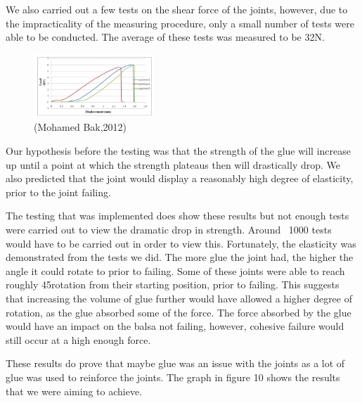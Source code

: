 \documentclass[12pt]{article}
\begin{document}
              
We also carried out a few tests on the shear force of the joints, however, due to the impracticality of the measuring procedure, only a small number of tests were able to be conducted. The average of these tests was measured to be 32N.
                 
                 \begin{figure}[h!]
                          \centering
                          \includegraphics[width=0.4\textwidth]{Articlegraph}
                          \caption{(Mohamed Bak,2012)}
                          \label{GraphGlue}
                 \end{figure}
Our hypothesis before the testing was that the strength of the glue will increase up until a point at which the strength plateaus then will drastically drop. We also predicted that the joint would display a reasonably high degree of elasticity, prior to the joint failing. 

The testing that was implemented does show these results but not enough tests were carried out to view the dramatic drop in strength. Around ~1000 tests would have to be carried out in order to view this. 
Fortunately, the elasticity was demonstrated from the tests we did. The more glue the joint had, the higher the angle it could rotate to prior to failing. Some of these joints were able to reach roughly 45\textdegree rotation from their starting position, prior to failing. This suggests that increasing the volume of glue further would have allowed a higher degree of rotation, as the glue absorbed some of the force. The force absorbed by the glue would have an impact on the balsa not failing, however, cohesive failure would still occur at a high enough force.

These results do prove that maybe glue was an issue with the joints as a lot of glue was used to reinforce the joints.
The graph in figure 10 shows the results that we were aiming to achieve.
\end{document}
